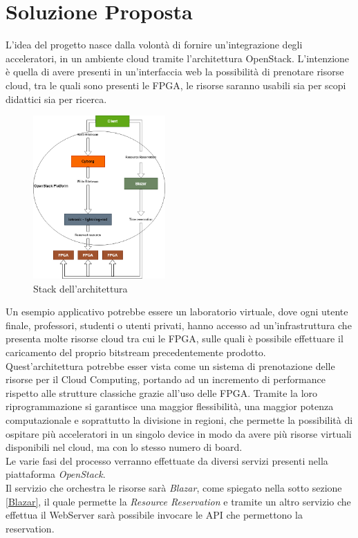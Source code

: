 \chapter{Soluzione Proposta}
\label{chap:Cap1}
L'idea del progetto nasce dalla volontà di fornire un'integrazione degli acceleratori, in un ambiente cloud tramite l'architettura OpenStack. L'intenzione è  quella di avere presenti in un'interfaccia web la possibilità di prenotare risorse cloud, tra le quali sono presenti le FPGA, le risorse saranno usabili sia per scopi didattici sia per ricerca.
\begin{figure}[h]
\centering
\includegraphics[width=0.45\textwidth]{images/Stack1.png}
\caption{Stack dell'architettura}
\end{figure}\clearpage
Un esempio applicativo potrebbe essere un laboratorio virtuale, dove ogni utente finale, professori, studenti o utenti privati, hanno accesso ad un'infrastruttura che presenta molte risorse cloud tra cui le FPGA, sulle quali è possibile effettuare il caricamento del proprio bitstream precedentemente prodotto.\\
Quest'architettura potrebbe esser vista come un sistema di prenotazione delle risorse per il Cloud Computing, portando ad un incremento di performance rispetto alle strutture classiche grazie all'uso delle FPGA. Tramite la loro riprogrammazione si garantisce una maggior flessibilità, una maggior potenza computazionale e soprattutto la divisione in regioni, che permette la possibilità di ospitare più acceleratori in un singolo device in modo da avere più risorse virtuali disponibili nel cloud, ma con lo stesso numero di board.\\
Le varie fasi del processo verranno effettuate da diversi servizi presenti nella piattaforma \textit{OpenStack}.\\
Il servizio che orchestra le risorse sarà \textit{Blazar}, come spiegato nella sotto sezione \ref{Blazar}, il quale permette la \textit{Resource Reservation} e tramite un altro servizio che effettua il WebServer sarà possibile invocare le API che permettono la reservation.
